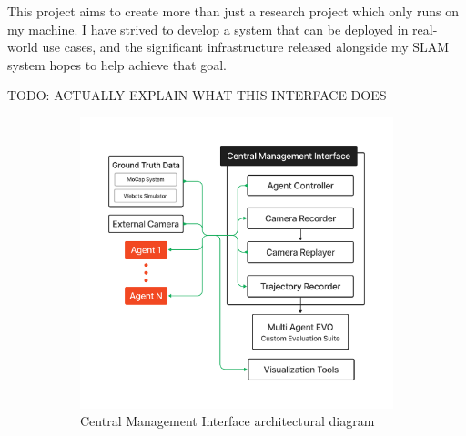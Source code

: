 This project aims to create more than just a research project which only runs on my machine. I have strived to develop a system that can be deployed in real-world use cases, and the significant infrastructure released alongside my SLAM system hopes to help achieve that goal.

TODO: ACTUALLY EXPLAIN WHAT THIS INTERFACE DOES

\begin{figure}[h]
    \centering
    \begin{subfigure}[c]{0.4\textwidth}
        \centering
        \includegraphics[trim=5cm 5cm 5cm 5cm, width=\linewidth]{figures/central_management_interface_diagram.pdf}
        \caption{Central Management Interface architectural diagram}
    \end{subfigure}\hfill%
    ~
    \begin{subfigure}[c]{0.55\textwidth}
        \centering

\end{subfigure}
\end{figure}
